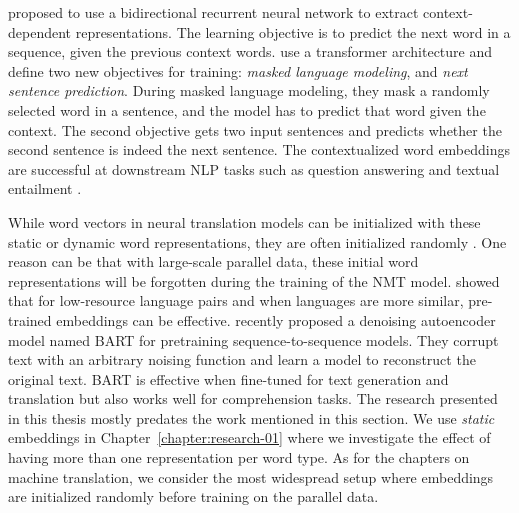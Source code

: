 \citet{peters-etal-2018-deep} proposed to use a bidirectional recurrent neural network to extract context-dependent representations.
The learning objective is to predict the next word in a sequence, given the previous context words. 
\citet{devlin-etal-2019-bert} use a transformer architecture and define two new objectives for training: \textit{masked language modeling}, and \textit{next sentence prediction}.
During masked language modeling, they mask a randomly selected word in a sentence, and the model has to predict that word given the context.
The second objective gets two input sentences and predicts whether the second sentence is indeed the next sentence.
The contextualized word embeddings are successful at downstream NLP tasks such as question answering and textual entailment \citep{zhang2019semanticsaware,garg2019tanda,Lan2020ALBERT:,mandar2020}.

While word vectors in neural translation models can be initialized with these static or dynamic word representations, they are often initialized randomly \citep{wu2016google}. 
One reason can be that with large-scale parallel data, these initial word representations will be forgotten during the training of the NMT model. 
\citet{qi-etal-2018-pre} showed that for low-resource language pairs and when languages are more similar, pre-trained embeddings can be effective.
\citet{lewis2019bart} recently proposed a denoising autoencoder model named BART for pretraining sequence-to-sequence models. 
They corrupt text with an arbitrary noising function and learn a model to reconstruct the original text.
BART is effective when fine-tuned for text generation and translation but also works well for comprehension tasks.
The research presented in this thesis mostly predates the work mentioned in this section.
We use \textit{static} embeddings in Chapter~\ref{chapter:research-01} where we investigate the effect of having more than one representation per word type. 
As for the chapters on machine translation, we consider the most widespread setup where embeddings are initialized randomly before training on the parallel data.